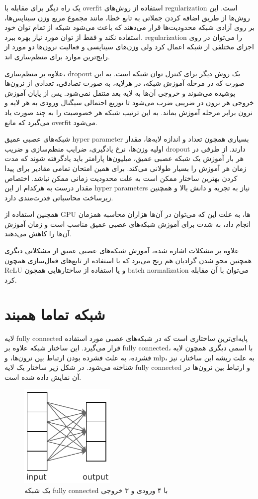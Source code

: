 یک راه دیگر برای مقابله با \gls{overfit} استفاده از روش‌های \gls{regularization}
است. این روش‌ها از طریق اضافه کردن جملاتی به تابع خطا، مانند مجموع مربع وزن
سیناپس‌ها، بر روی آزادی شبکه محدودیت‌ها قرار می‌دهند که باعث می‌شود شبکه از تمام
توان خود استفاده نکند و فقط از توان مورد نیاز بهره ببرد. \gls{regularization} را
می‌توان در روی اجزای مختلفی از شبکه اعمال کرد ولی وزن‌های سیناپسی و فعالیت
نرون‌ها دو مورد از رایج‌ترین موارد برای منظم‌سازی اند.

علاوه بر منظم‌سازی، dropout یک روش دیگر برای کنترل توان شبکه است. به این صورت که
در مرحله آموزش شبکه، در هرلایه، به صورت تصادفی، تعدادی از نرون‌ها پوشیده می‌شوند
و خروجی آن‌ها به لایه بعد منتقل نمی‌شود. پس از پایان آموزش خروجی هر نرون در
ضریبی ضرب می‌شود تا توزیع احتمالی سیگنال ورودی به هر لایه و نرون برابر مرحله
آموزش بماند. به این ترتیب شبکه‌ هر خصوصیت را به چند صورت یاد می‌گیرد که مانع
\gls{overfit} می‌شود.

شبکه‌های عصبی عمیق \gls{hyper parameter} بسیاری همچون تعداد و اندازه لایه‌ها،
مقدار اولیه وزن‌ها، نرخ یادگیری، ضرایب منظم‌سازی و ضریب dropout دارند. از طرفی
در هر بار آموزش یک شبکه عصبی عمیق، میلیون‌ها پارامتر باید یادگرفته شوند که مدت
زمان هر آموزش را بسیار طولانی می‌کند. برای همین امتحان تمامی مقادیر برای پیدا
کردن بهترین ساختار ممکن است به علت محدودیت زمانی ممکن نباشد. اختصاص مقدار درست
به هرکدام از این \glspl{hyper parameter} نیاز به تجربه و دانش بالا و همچنین
زیرساخت محاسباتی قدرت‌مندی دارد.

همچنین استفاده از \gls{GPU} ها، به علت این که می‌توان در آن‌ها هزاران محاسبه همزمان
انجام داد، به شدت برای آموزش شبکه‌های عصبی عمیق مناسب است و زمان آموزش آن‌ها را
کاهش می‌دهند.

علاوه بر مشکلات اشاره شده، آموزش شبکه‌های عصبی عمیق از مشکلاتی دیگری همچنین محو
شدن گرادیان‌ هم رنج می‌برد که با استفاده از تابع‌های فعال‌سازی همچون ReLU و یا
استفاده از ساختارهایی همچون \gls{batch normalization} می‌توان با آن مقابله کرد.

\section{شبکه تماما همبند}
لایه \gls{fully connected} پایه‌ای‌ترین ساختاری است که در شبکه‌های عصبی مورد
استفاده قرار می‌گیرد. این ساختار شبکه علاوه بر \gls{fully connected}، با اسمی
دیگری همچون لایه فشرده، به علت فشرده بودن ارتباط بین نرون‌ها، و \gls{mlp}، به
علت ریشه این ساختار، نیز شناخته می‌شود. در شکل زیر ساختار یک لایه \gls{fully
connected} و ارتباط بین نرون‌ها در آن نمایش داده شده است.
\begin{figure}[ht]
    \centering
    \includegraphics[height=5cm]{./statics/fully_connected.png}
    \caption{یک شبکه \gls{fully connected} با ۴ ورودی و ۳ خروجی}
\end{figure}

